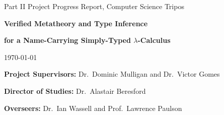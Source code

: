 \begin{titlepage}

\medskip
{}
\medskip
{}

\vfil

\centerline{\large Part II Project Progress Report, Computer Science Tripos}
\vspace{0.4in}
\centerline{\Large\bf Verified Metatheory and Type Inference}
\centerline{\Large\bf for a Name-Carrying Simply-Typed \(\lambda\)-Calculus}
\vspace{0.3in}
\centerline{\large \today}

\vfil

{\bf Project Supervisors:} Dr.~Dominic Mulligan and Dr.~Victor Gomes

\vspace{0.2in}

{\bf Director of Studies:} Dr.~Alastair Beresford

\vspace{0.2in}

{\bf Overseers:} Dr.~Ian Wassell and Prof.~Lawrence Paulson

\vfil
\end{titlepage}
